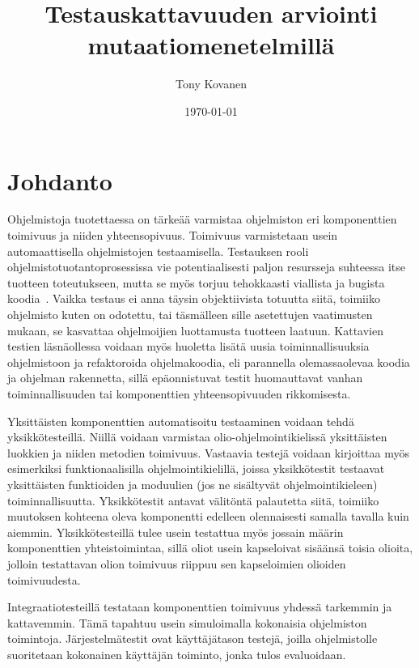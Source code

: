\documentclass[finnish]{tktltiki2}
\title{Testauskattavuuden arviointi mutaatiomenetelmillä}
\author{Tony Kovanen}
\date{\today}
\begin{document}
\frontmatter

\maketitle
\makeabstract

\tableofcontents
\newpage

\section{Johdanto}
Ohjelmistoja tuotettaessa on tärkeää varmistaa ohjelmiston eri komponenttien toimivuus ja niiden yhteensopivuus. Toimivuus varmistetaan usein automaattisella ohjelmistojen testaamisella. Testauksen rooli ohjelmistotuotantoprosessissa vie potentiaalisesti paljon resursseja suhteessa itse tuotteen toteutukseen, mutta se myös torjuu tehokkaasti viallista ja bugista koodia~\cite{SchulerZ10}. Vaikka testaus ei anna täysin objektiivista totuutta siitä, toimiiko ohjelmisto kuten on odotettu, tai täsmälleen sille asetettujen vaatimusten mukaan, se kasvattaa ohjelmoijien luottamusta tuotteen laatuun. Kattavien testien läsnäollessa voidaan myös huoletta lisätä uusia toiminnallisuuksia ohjelmistoon ja refaktoroida ohjelmakoodia, eli parannella olemassaolevaa koodia ja ohjelman rakennetta, sillä epäonnistuvat testit huomauttavat vanhan toiminnallisuuden tai komponenttien yhteensopivuuden rikkomisesta. 

Yksittäisten komponenttien automatisoitu testaaminen voidaan tehdä yksikkötesteillä. Niillä voidaan varmistaa olio-ohjelmointikielissä yksittäisten luokkien ja niiden metodien toimivuus. Vastaavia testejä voidaan kirjoittaa myös esimerkiksi funktionaalisilla ohjelmointikielillä, joissa yksikkötestit testaavat yksittäisten funktioiden ja moduulien (jos ne sisältyvät ohjelmointikieleen) toiminnallisuutta. Yksikkötestit antavat välitöntä palautetta siitä, toimiiko muutoksen kohteena oleva komponentti edelleen olennaisesti samalla tavalla kuin aiemmin. Yksikkötesteillä tulee usein testattua myös jossain määrin komponenttien yhteistoimintaa, sillä oliot usein kapseloivat sisäänsä toisia olioita, jolloin testattavan olion toimivuus riippuu sen kapseloimien olioiden toimivuudesta. 

Integraatiotesteillä testataan komponenttien toimivuus yhdessä tarkemmin ja kattavemmin. Tämä tapahtuu usein simuloimalla kokonaisia ohjelmiston toimintoja. Järjestelmätestit ovat käyttäjätason testejä, joilla ohjelmistolle suoritetaan kokonainen käyttäjän toiminto, jonka tulos evaluoidaan. 
\end{document}
